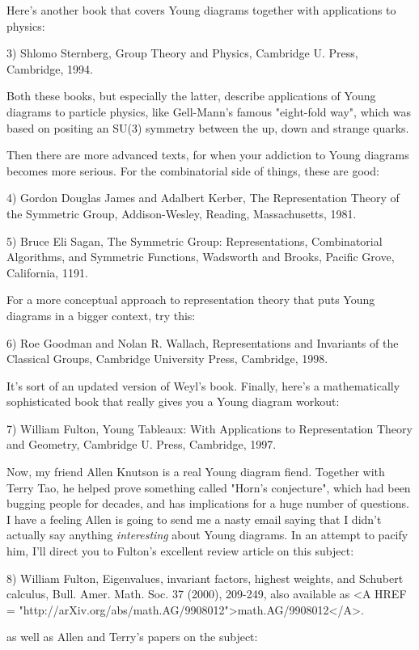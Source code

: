 Here's another book that covers Young diagrams together with applications
to physics:

3) Shlomo Sternberg, Group Theory and Physics, Cambridge U. Press,
Cambridge, 1994.

Both these books, but especially the latter, describe applications of
Young diagrams to particle physics, like Gell-Mann's famous "eight-fold
way", which was based on positing an SU(3) symmetry between the up, down
and strange quarks.

Then there are more advanced texts, for when your addiction to Young
diagrams becomes more serious.  For the combinatorial side of things,
these are good:

4) Gordon Douglas James and Adalbert Kerber, The Representation Theory 
of the Symmetric Group, Addison-Wesley, Reading, Massachusetts, 1981.

5) Bruce Eli Sagan, The Symmetric Group: Representations, Combinatorial 
Algorithms, and Symmetric Functions, Wadsworth and Brooks, Pacific Grove,
California, 1191.

For a more conceptual approach to representation theory that puts Young
diagrams in a bigger context, try this:

6) Roe Goodman and Nolan R. Wallach, Representations and Invariants of the 
Classical Groups, Cambridge University Press, Cambridge, 1998.

It's sort of an updated version of Weyl's book.  Finally, here's
a mathematically sophisticated book that really gives you a Young
diagram workout:

7) William Fulton, Young Tableaux: With Applications to Representation
Theory and Geometry, Cambridge U. Press, Cambridge, 1997.

Now, my friend Allen Knutson is a real Young diagram fiend.  Together
with Terry Tao, he helped prove something called "Horn's conjecture",
which had been bugging people for decades, and has implications for a
huge number of questions.  I have a feeling Allen is going to send me a
nasty email saying that I didn't actually say anything \emph{interesting}
about Young diagrams.  In an attempt to pacify him, I'll direct you to
Fulton's excellent review article on this subject:

8) William Fulton, Eigenvalues, invariant factors, highest weights, and
Schubert calculus, Bull. Amer. Math. Soc. 37 (2000), 209-249, also
available as <A HREF =
"http://arXiv.org/abs/math.AG/9908012">math.AG/9908012</A>.

as well as Allen and Terry's papers on the subject:

